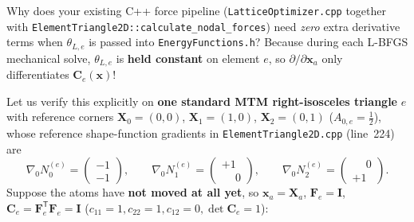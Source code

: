 \documentclass[11pt,a4paper]{article}
\newcommand{\T}{^{\mathsf T}}
\newcommand{\code}[1]{\texttt{#1}}
\begin{document}
Why does your existing C++ force pipeline (\code{LatticeOptimizer.cpp} together with \code{ElementTriangle2D::\allowbreak{}calculate\_nodal\_forces}) need \emph{zero} extra derivative terms when $\theta_{L,e}$ is passed into \code{EnergyFunctions.h}? Because during each L-BFGS mechanical solve, $\theta_{L,e}$ is \textbf{held constant} on element $e$, so $\partial/\partial\mathbf{x}_a$ only differentiates $\mathbf{C}_e(\mathbf{x})$!

Let us verify this explicitly on \textbf{one standard MTM right-isosceles triangle} $e$ with reference corners $\mathbf{X}_0=(0,0)$, $\mathbf{X}_1=(1,0)$, $\mathbf{X}_2=(0,1)$ ($A_{0,e}=\frac{1}{2}$), whose reference shape-function gradients in \code{ElementTriangle2D.cpp} (line~224) are
\begin{equation}
  \nabla_0 N_0^{(e)} = \begin{pmatrix}-1 \\ -1\end{pmatrix}, \qquad
  \nabla_0 N_1^{(e)} = \begin{pmatrix}+1 \\ \phantom{+}0\end{pmatrix}, \qquad
  \nabla_0 N_2^{(e)} = \begin{pmatrix}\phantom{+}0 \\ +1\end{pmatrix}.
\end{equation}
Suppose the atoms have \textbf{not moved at all yet}, so $\mathbf{x}_a = \mathbf{X}_a$, $\mathbf{F}_e = \mathbf{I}$, $\mathbf{C}_e = \mathbf{F}_e\T\mathbf{F}_e = \mathbf{I}$ ($c_{11}=1, c_{22}=1, c_{12}=0, \det\mathbf{C}_e=1$):
\end{document}
